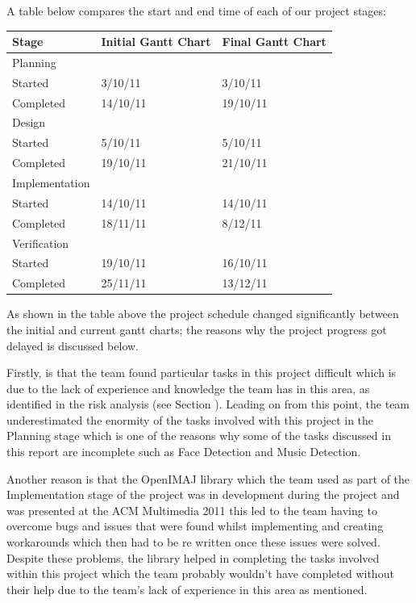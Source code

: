 A table below compares the start and end time of each of our project stages:
\begin{center}
\begin{tabular}{|l|l|l|}
\hline
\textbf{Stage}					&\textbf{Initial Gantt Chart}		&\textbf{Final Gantt Chart}	\\\hline
Planning					&					&				\\\hline
\hspace{5mm}Started		&3/10/11			&3/10/11		\\\hline
\hspace{5mm}Completed	&14/10/11			&19/10/11		\\\hline
Design					&					&				\\\hline
\hspace{5mm}Started		&5/10/11			&5/10/11		\\\hline
\hspace{5mm}Completed	&19/10/11			&21/10/11		\\\hline
Implementation			&					&				\\\hline
\hspace{5mm}Started		&14/10/11			&14/10/11		\\\hline
\hspace{5mm}Completed	&18/11/11			&8/12/11		\\\hline
Verification				&					&				\\\hline
\hspace{5mm}Started		&19/10/11			&16/10/11		\\\hline
\hspace{5mm}Completed	&25/11/11			&13/12/11		\\\hline
\end{tabular}
\end{center}

As shown in the table above the project schedule changed significantly between the initial and current gantt charts; the reasons why the project progress got delayed is discussed below. 

Firstly, is that the team found particular tasks in this project difficult which is due to the lack of experience and knowledge the team has in this area, as identified in the risk analysis (see Section \label{sec:Risks}). Leading on from this point, the team underestimated the enormity of the tasks involved with this project in the Planning stage which is one of the reasons why some of the tasks discussed in this report are incomplete such as Face Detection and Music Detection.

Another reason is that the OpenIMAJ library \cite{citeOpenImaj} which the team used as part of the Implementation stage of the project was in development during the project and was presented at the ACM Multimedia 2011 \cite{competition} this led to the team having to overcome bugs and issues that were found whilst implementing and creating workarounds which then had to be re written once these issues were solved. Despite these problems, the library helped in completing the tasks involved within this project which the team probably wouldn't have completed without their help due to the team’s lack of experience in this area as mentioned.

